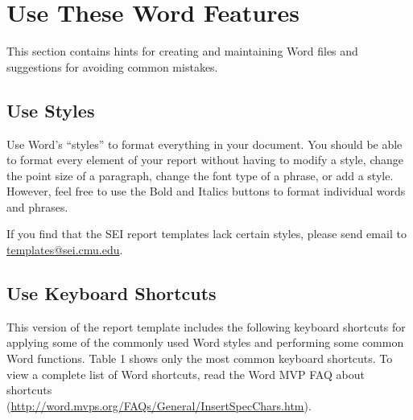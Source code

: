 \chapter{Use These Word Features}\label{ch:usethese}
This section contains hints for creating and maintaining Word files and suggestions for avoiding common mistakes.

\section{Use Styles}
Use Word's ``styles'' to format everything in your document. You should be able to format every element of your report without having to modify a style, change the point size of a paragraph, change the font type of a phrase, or add a style. However, feel free to use the Bold and Italics buttons to format individual words and phrases.

If you find that the SEI report templates lack certain styles, please send email to \\\href{mailto:templates@sei.cmu.edu}{templates@sei.cmu.edu}.

\section{Use Keyboard Shortcuts}
This version of the report template includes the following keyboard shortcuts for applying some of the commonly used Word styles and performing some common Word functions. Table 1 shows only the most common keyboard shortcuts. To view a complete list of Word shortcuts, read the Word MVP FAQ about shortcuts\\
(\href{http://word.mvps.org/FAQs/General/InsertSpecChars.htm}{http://word.mvps.org/FAQs/General/InsertSpecChars.htm}).


